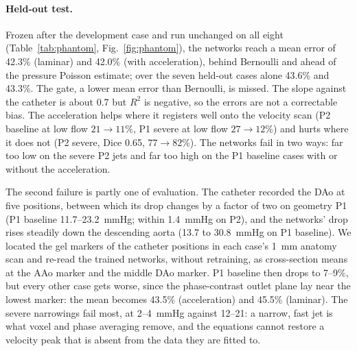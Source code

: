 \paragraph{Held-out test.} Frozen after the development case and run unchanged on all eight
(Table~\ref{tab:phantom}, Fig.~\ref{fig:phantom}), the networks reach a mean error of 42.3\% (laminar) and 42.0\% (with
acceleration), behind Bernoulli and ahead of the pressure Poisson estimate; over the seven held-out cases alone 43.6\%
and 43.3\%. The gate, a lower mean error than Bernoulli, is missed. The slope against the catheter is about 0.7 but
$R^2$ is negative, so the errors are not a correctable bias. The acceleration helps where it registers well onto the
velocity scan (P2 baseline at low flow $21\to11\%$, P1 severe at low flow $27\to12\%$) and hurts where it does not
(P2 severe, Dice 0.65, $77\to82\%$). The networks fail in two ways: far too low on the severe P2 jets and far too
high on the P1 baseline cases with or without the acceleration.

The second failure is partly one of evaluation. The catheter recorded the DAo at five positions, between which its
drop changes by a factor of two on geometry P1 (P1 baseline 11.7--23.2~mmHg; within 1.4~mmHg on P2), and the
networks' drop rises steadily down the descending aorta (13.7 to 30.8~mmHg on P1 baseline). We located the gel
markers of the catheter positions in each case's 1~mm anatomy scan and re-read the trained networks, without
retraining, as cross-section means at the AAo marker and the middle DAo marker. P1 baseline then drops to 7--9\%, but
every other case gets worse, since the phase-contrast outlet plane lay near the lowest marker: the mean becomes
43.5\% (acceleration) and 45.5\% (laminar). The severe narrowings fail most, at 2--4~mmHg against 12--21: a narrow,
fast jet is what voxel and phase averaging remove, and the equations cannot restore a velocity peak that is absent
from the data they are fitted to.
